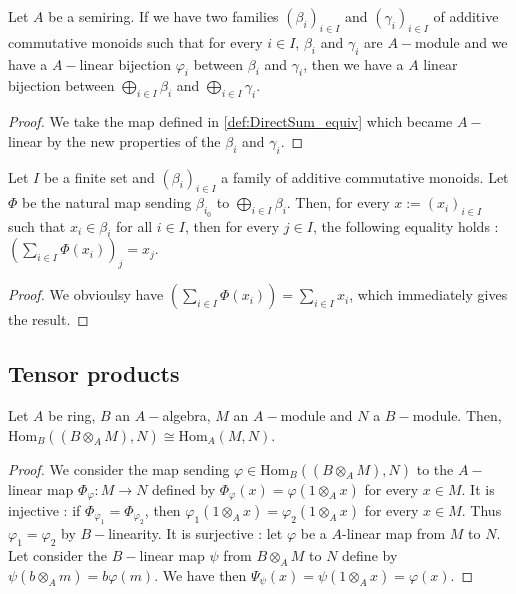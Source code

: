 \begin{definition}
    \label{def:DirectSum_equiv_linearmap}
    \leanok
    Let $A$ be a semiring. If we have two families $(\beta_i)_{i\in I}$ and $(\gamma_i)_{i\in I}$ of additive commutative
    monoids such that for every $i\in I$, $\beta_i$ and $\gamma_i$ are $A-$module and we have a $A-$linear bijection $\varphi_i$ between 
    $\beta_i$ and $\gamma_i$, then we have a $A$ linear bijection
    between $\bigoplus\limits_{i\in I}\beta_i$ and $\bigoplus\limits_{i\in I}\gamma_i$.
    \begin{proof}
        \leanok
        We take the map defined in \ref{def:DirectSum_equiv} which became $A-$linear by
        the new properties of the $\beta_i$ and $\gamma_i$.
    \end{proof}
\end{definition}

\begin{proposition}
    \label{prop:DirectSum_eq_sum_direct}
    \leanok
    Let $I$ be a finite set and $(\beta_i)_{i\in I}$ a family of additive commutative monoids.
    Let $\Phi$ be the natural map sending $\beta_{i_0}$ to $\bigoplus\limits_{i\in I}\beta_i$.
    Then, for every $x:=(x_i)_{i\in I}$ such that $x_i\in\beta_i$ for all $i\in I$, then for every $j\in I$,
    the following equality holds : $\left(\sum\limits_{i\in I} \Phi(x_i)\right)_j=x_j$.
\end{proposition}
\begin{proof}
    \leanok
    We obvioulsy have $\left(\sum\limits_{i\in I} \Phi(x_i)\right)=\sum\limits_{i\in I}x_i$,
    which immediately gives the result.
\end{proof}

\subsection{Tensor products}

\begin{definition}
    \label{def:iso_hom_tens}
    \leanok
    Let $A$ be ring, $B$ an $A-$algebra, $M$ an $A-$module and $N$ a $B-$module. Then,
    $\text{Hom}_B((B\otimes_AM),N)\cong \text{Hom}_A(M,N)$.
    \begin{proof}
        \leanok
        We consider the map sending $\varphi\in\text{Hom}_B((B\otimes_AM),N)$ to the $A-$linear map
        $\Phi_\varphi : M \rightarrow N$ defined by $\Phi_\varphi(x)=\varphi (1\otimes_A x)$ for every $x\in M$.
        It is injective : if $\Phi_{\varphi_1}=\Phi_{\varphi_2}$, then $\varphi_1(1\otimes_A x)=\varphi_2(1\otimes_A x)$
        for every $x\in M$. Thus $\varphi_1=\varphi_2$ by $B-$linearity.
        It is surjective : let $\varphi$ be a $A$-linear map from $M$ to $N$. Let consider the $B-$linear map
        $\psi$ from $B\otimes_AM$ to $N$ define by $\psi (b\otimes_A m) = b \varphi (m)$. We have then 
        $\Psi_\psi(x)=\psi (1\otimes_A x)= \varphi(x)$.

    \end{proof}
\end{definition}


